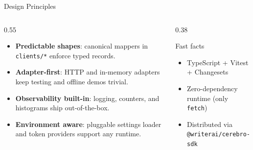 \documentclass[aspectratio=169]{beamer}
\begin{document}
\begin{frame}{Design Principles}
  \begin{columns}
    \begin{column}{0.55\textwidth}
      \begin{itemize}
        \item \textbf{Predictable shapes}: canonical mappers in \texttt{clients/*} enforce typed records.
        \item \textbf{Adapter-first}: HTTP and in-memory adapters keep testing and offline demos trivial.
        \item \textbf{Observability built-in}: logging, counters, and histograms ship out-of-the-box.
        \item \textbf{Environment aware}: pluggable settings loader and token providers support any runtime.
      \end{itemize}
    \end{column}
    \begin{column}{0.38\textwidth}
      \begin{block}{Fast facts}
        \begin{itemize}
          \item TypeScript + Vitest + Changesets
          \item Zero-dependency runtime (only \texttt{fetch})
          \item Distributed via \texttt{@writerai/cerebro-sdk}
        \end{itemize}
      \end{block}
    \end{column}
  \end{columns}
\end{frame}
\end{document}
